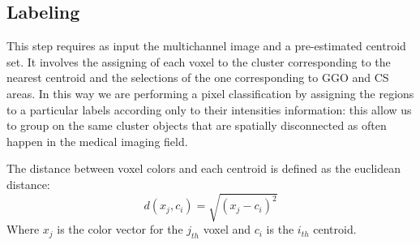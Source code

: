 \documentclass{standalone}
\begin{document}
	\subsection*{Labeling}
	
	This step requires as input the multichannel image and a pre-estimated centroid set. It involves the assigning of each voxel to the cluster corresponding to the nearest centroid and the selections of the one corresponding to GGO and CS areas. In this way we are performing a pixel classification by assigning the regions to a particular labels according only to their intensities information: this allow us to group on the same cluster objects that are spatially disconnected as often happen in the medical imaging field.
	
	The distance between voxel colors and each centroid is defined as the euclidean distance:
	\begin{equation*}
		d(x_j, c_i) = \sqrt{(x_j - c_i)^2}
	\end{equation*} 
	Where $x_j$ is the color vector for the $j_{th}$ voxel and $c_i$ is the $i_{th}$ centroid.\\
	
	
\end{document}
